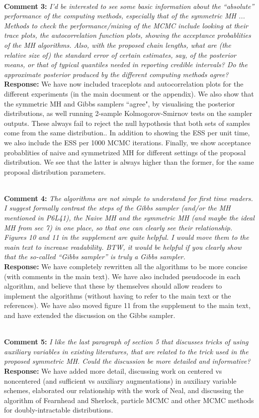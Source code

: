 \documentclass[11pt]{article}
\newcommand{\rev}[2]{\textbf{Comment #1: }\emph{#2}}
\newcommand{\resp}{\textbf{Response: }}
\begin{document}
~\\ 
\rev{3}{I’d be interested to see some basic information about the “absolute” performance of the computing methods, especially that of the symmetric MH ... Methods to check the performance/mixing of the MCMC include looking at their trace plots, the autocorrelation function plots, showing the acceptance probablities of the MH algorithms. Also, with the proposed chain lengths, what are (the relative size of) the standard error of certain estimates, say, of the posterior means, or that of typical quantiles needed in reporting credible intervals? Do the approximate posterior produced by the different computing methods agree? }
\\
\resp We have now included traceplots and autocorrelation plots for the different experiments (in the main document or the appendix). We also show that the symmetric MH and Gibbs samplers ``agree", by visualising the posterior distributions, as well running 2-sample Kolmogorov-Smirnov tests on the sampler outputs. These always fail to reject the null hypothesis that both sets of samples come from the same distribution..
In addition to showing the ESS per unit time, we also include the ESS per 1000 MCMC iterations. 
Finally, we show acceptance probablities of naive and symmetrized MH for different settings of the proposal distribution. We see that the latter is always higher than the former, for the same proposal distribution parameters.

~\\
\rev{4}{The algorithms are not simple to understand for first time readers. I suggest formally contrast the steps of the Gibbs sampler (and/or the MH mentioned in P6L41), the Naive MH and the symmetric MH (and maybe the ideal MH from sec 7) in one place, so that one can clearly see their relationship.  Figures 10 and 11 in the supplement are quite helpful. I would move them to the main text to increase readability.
BTW, it would be helpful if you clearly show that the so-called “Gibbs sampler” is truly a Gibbs sampler.}
\\ 
\resp We have completely rewritten all the algorithms to be more concise (with comments in the main text). We have also included pseudocode in each algorithm, and believe that these by themselves should allow readers to implement the algorithms (without having to refer to the main text or the references). We have also moved figure 11 from the supplement to the main text, and have extended the discussion on the Gibbs sampler.

~\\
\noindent \rev{5}{I like the last paragraph of section 5 that discusses tricks of using auxiliary variables in
existing literatures, that are related to the trick used in the proposed symmetric MH.
Could the discussion be more detailed and informative?
} \\
\resp{We have added more detail, discussing work on centered vs noncentered (and sufficient vs auxiliary augmentations) in auxiliary variable schemes, elaborated our relationship with the work of Neal, and discussing the algorithm of Fearnhead and Sherlock, particle MCMC and other MCMC methods for doubly-intractable distributions.}
\end{document}

